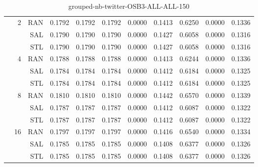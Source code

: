 \begin{center}
\begin{table}[htbp]
\begin{center}
\begin{tabular}{ | r | r | r | r | r | r | r | r | r | r | r |}
 & \multirow{3}{*}{2} & RAN & 0.1792 & 0.1792 & 0.1792 & 0.0000 & 0.1413 & 0.6250 & 0.0000 & 0.1336\\ \cline{3-11}
 &   & SAL & 0.1790 & 0.1790 & 0.1790 & 0.0000 & 0.1427 & 0.6058 & 0.0000 & 0.1316\\ \cline{3-11}
 &   & STL & 0.1790 & 0.1790 & 0.1790 & 0.0000 & 0.1427 & 0.6058 & 0.0000 & 0.1316\\ \cline{2-11}
 & \multirow{3}{*}{4} & RAN & 0.1788 & 0.1788 & 0.1788 & 0.0000 & 0.1413 & 0.6244 & 0.0000 & 0.1336\\ \cline{3-11}
 &   & SAL & 0.1784 & 0.1784 & 0.1784 & 0.0000 & 0.1412 & 0.6184 & 0.0000 & 0.1325\\ \cline{3-11}
 &   & STL & 0.1784 & 0.1784 & 0.1784 & 0.0000 & 0.1412 & 0.6184 & 0.0000 & 0.1325\\ \cline{2-11}
 & \multirow{3}{*}{8} & RAN & 0.1810 & 0.1810 & 0.1810 & 0.0000 & 0.1442 & 0.6570 & 0.0000 & 0.1339\\ \cline{3-11}
 &   & SAL & 0.1787 & 0.1787 & 0.1787 & 0.0000 & 0.1412 & 0.6087 & 0.0000 & 0.1322\\ \cline{3-11}
 &   & STL & 0.1787 & 0.1787 & 0.1787 & 0.0000 & 0.1412 & 0.6087 & 0.0000 & 0.1322\\ \cline{2-11}
 & \multirow{3}{*}{16} & RAN & 0.1797 & 0.1797 & 0.1797 & 0.0000 & 0.1416 & 0.6540 & 0.0000 & 0.1334\\ \cline{3-11}
 &   & SAL & 0.1785 & 0.1785 & 0.1785 & 0.0000 & 0.1408 & 0.6377 & 0.0000 & 0.1326\\ \cline{3-11}
 &   & STL & 0.1785 & 0.1785 & 0.1785 & 0.0000 & 0.1408 & 0.6377 & 0.0000 & 0.1326\\ \cline{2-11}
\hline
\end{tabular}
\caption{grouped-nb-twitter-OSB3-ALL-ALL-150}
\end{center}
 \end{table}
\end{center}

